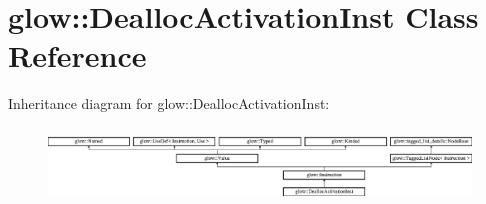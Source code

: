 \hypertarget{classglow_1_1_dealloc_activation_inst}{}\section{glow\+:\+:Dealloc\+Activation\+Inst Class Reference}
\label{classglow_1_1_dealloc_activation_inst}
Inheritance diagram for glow\+:\+:Dealloc\+Activation\+Inst\+:\begin{figure}[H]
\begin{center}
\leavevmode
\includegraphics[height=1.991111cm]{classglow_1_1_dealloc_activation_inst}
\end{center}
\end{figure}
